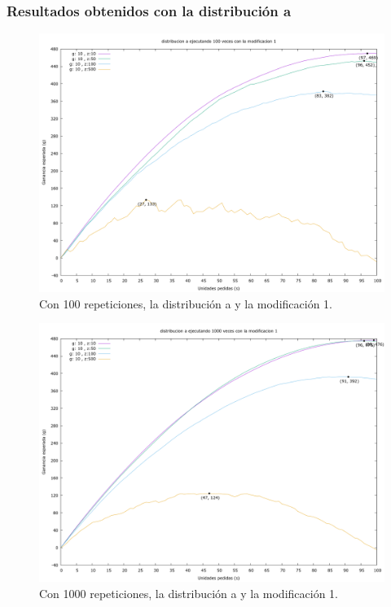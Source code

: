 \documentclass[12pt, spanish]{article}
\begin{document}
\subsubsection{Resultados obtenidos con la distribución a}

\begin{figure}[H]
	\centering
	\includegraphics[scale = 0.2]{prob_a/datos_a_100_1.png}
	\caption{Con 100 repeticiones, la distribución a y la modificación 1.}
	\label{fig:ej1_a_100}

\end{figure}

\begin{figure}[H]
	\centering
	\includegraphics[scale = 0.2]{prob_a/datos_a_1000_1.png}
	\caption{Con 1000 repeticiones, la distribución a y la modificación 1.}
	\label{fig:ej1_a_1000}

\end{figure}
\end{document}
